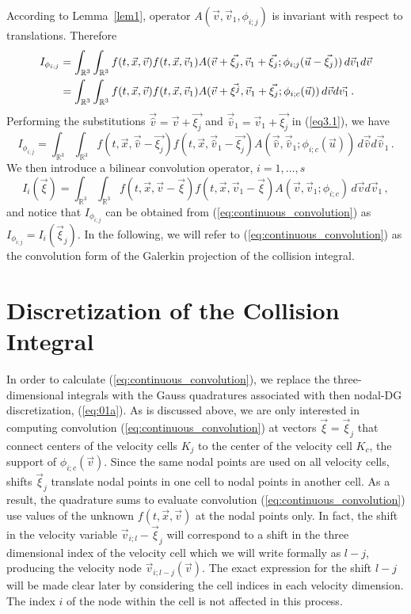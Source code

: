\documentclass[12pt]{CSUNthesis}
\def\R{\mathbb{R}}
\def\R{\mathbb{R}}
\begin{document}
According to  Lemma~{\ref{lem1}}, operator $A(\vec{v},\vec{v}_1,\phi_{i;j})$ is invariant with respect to translations. Therefore
\begin{align}
\label{eq3.1}
I_{\phi_{i;j}} &= \int_{\R^3}\int_{\R^3} f(t,\vec{x},\vec{v})f(t,\vec{x},\vec{v}_{1})A(\vec{v}+\vec{\xi_{j}},\vec{v}_1+\vec{\xi_{j}}; \phi_{i;j}(\vec{u} - \vec{\xi_{j}})) \, d\vec{v}_{1} d\vec{v} \notag\\
 &= \int_{\R^3}\int_{\R^3} f(t,\vec{x},\vec{v})f(t,\vec{x},\vec{v}_{1})A(\vec{v}+\vec{\xi^{j}},\vec{v}_{1}+\vec{\xi_{j}}; \phi_{i;c}(\vec{u})) \, d\vec{v} d\vec{v_{1}} \, .
\end{align}
Performing the substitutions $\vec{\hat{v}} = \vec{v}+\vec{\xi_{j}} $ and $ \vec{\hat{v}}_1 = \vec{v}_{1}+\vec{\xi_{j}}$ in (\ref{eq3.1}), we have
\begin{equation*}
I_{\phi_{i;j}} = \int_{\R^3}\int_{\R^3} f(t,\vec{x},\vec{\hat{v}}-\vec{\xi_{j}}) f(t,\vec{x},\vec{\hat{v}}_1-\vec{\xi_{j}}) A(\vec{\hat{v}},\vec{\hat{v}}_{1};\phi_{i;c}(\vec{u})) \, d\vec{\hat{v}} d\vec{\hat{v}}_1 \, .
\end{equation*}
We then introduce a bilinear convolution operator, $i=1,\ldots,s$
\begin{equation}
\label{eq:continuous_convolution}
I_i(\vec{\xi}) = \int_{\R^3}\int_{\R^3} f(t,\vec{x},\vec{v}-\vec{\xi})f(t,\vec{x},\vec{v}_{1}-\vec{\xi})A(\vec{v},\vec{v}_{1}; \phi_{i;c}) \, d\vec{v} d\vec{v}_{1} \, ,
\end{equation}
and notice that $I_{\phi_{i;j}}$ can be obtained from (\ref{eq:continuous_convolution}) as
$I_{\phi_{i;j}}=I_i(\vec{\xi}_j)$. In the following, we will refer to (\ref{eq:continuous_convolution}) 
as the convolution form of the Galerkin projection of the collision integral.


\section{Discretization of the Collision Integral}
In order to calculate (\ref{eq:continuous_convolution}), we replace the three-dimensional integrals with the Gauss quadratures associated with then nodal-DG discretization, (\ref{eq:01a}). 
As is discussed above, we are only interested in 
computing convolution (\ref{eq:continuous_convolution}) at vectors 
$\vec{\xi}=\vec{\xi}_{j}$ that connect centers of the velocity cells $K_j$ to the 
center of the velocity cell $K_c$, the support of $\phi_{i;c}(\vec{v})$. Since the 
same nodal points are used on all velocity cells, shifts $\vec{\xi}_{j}$ 
translate nodal points in one cell to nodal points 
in another cell. As a result, the quadrature sums to evaluate convolution (\ref{eq:continuous_convolution})
use values of the unknown $f(t,\vec{x},\vec{v})$ at the nodal points
only. In fact, the shift in the velocity variable 
$\vec{v}_{i;l}-\vec{\xi}_{j}$ will correspond 
to a shift in the three dimensional index of the velocity cell 
which we will write formally as $l-j$, 
producing the velocity node $\vec{v}_{i;l-j}(\vec{v})$. The exact expression 
for the shift $l-j$ will be made clear later by considering the cell indices in 
each velocity dimension. The index $i$ of the node within the cell is not 
affected in this process. 
\end{document}
